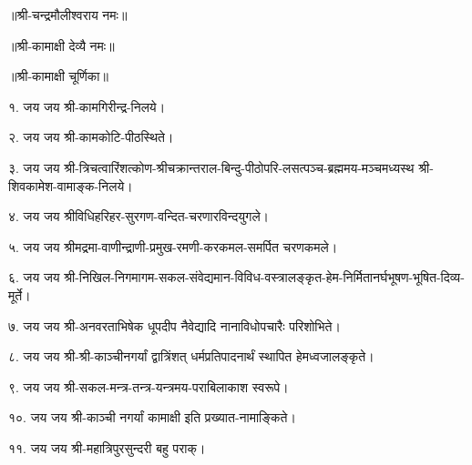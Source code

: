 ॥श्री-चन्द्रमौलीश्वराय नमः॥

॥श्री-कामाक्षी देव्यै नमः॥

॥श्री-कामाक्षी चूर्णिका॥

१. जय जय श्री-कामगिरीन्द्र-निलये। 

२. जय जय श्री-कामकोटि-पीठस्थिते।

३. जय जय श्री-त्रिचत्वारिंशत्कोण-श्रीचक्रान्तराल-बिन्दु-पीठोपरि-लसत्पञ्च-ब्रह्ममय-मञ्चमध्यस्थ श्री-शिवकामेश-वामाङ्क-निलये।

४. जय जय श्रीविधिहरिहर-सुरगण-वन्दित-चरणारविन्दयुगले।

५. जय जय श्रीमद्रमा-वाणीन्द्राणी-प्रमुख-रमणी-करकमल-समर्पित चरणकमले।

६. जय जय श्री-निखिल-निगमागम-सकल-संवेद्यमान-विविध-वस्त्रालङ्कृत-हेम-निर्मितानर्घभूषण-भूषित-दिव्य-मूर्ते।

७. जय जय श्री-अनवरताभिषेक धूपदीप नैवेद्यादि नानाविधोपचारैः परिशोभिते।

८. जय जय श्री-श्री-काञ्चीनगर्यां द्वात्रिंशत् धर्मप्रतिपादनार्थं स्थापित हेमध्वजालङ्कृते। 

९. जय जय श्री-सकल-मन्त्र-तन्त्र-यन्त्रमय-पराबिलाकाश स्वरूपे।

१०. जय जय श्री-काञ्ची नगर्यां कामाक्षी इति प्रख्यात-नामाङ्किते। 

११. जय जय श्री-महात्रिपुरसुन्दरी बहु पराक्। 